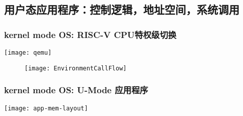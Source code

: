 


\subsection{用户态应用程序：控制逻辑，地址空间，系统调用}


\begin{frame}
	\frametitle{kernel mode OS: RISC-V CPU特权级切换}
	\centering
	\texttt{[image: qemu]}
	
%		
%
\begin{figure}
	\centering
    \texttt{[image: EnvironmentCallFlow]}
    \end{figure}	
\end{frame}
\begin{frame}
    
    \frametitle{kernel mode OS: U-Mode 应用程序}
    \centering
    \texttt{[image: app-mem-layout]}
    
\end{frame}

